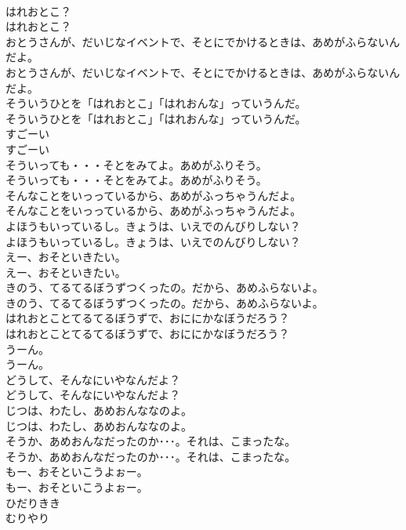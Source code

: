 \documentclass[8pt]{extreport}
\begin{document}
\begin{CJK}{UTF8}{min}
\\	はれおとこ？
\\	はれおとこ？
\\	おとうさんが、だいじなイベントで、そとにでかけるときは、あめがふらないんだよ。
\\	おとうさんが、だいじなイベントで、そとにでかけるときは、あめがふらないんだよ。
\\	そういうひとを「はれおとこ」「はれおんな」っていうんだ。
\\	そういうひとを「はれおとこ」「はれおんな」っていうんだ。
\\	すごーい
\\	すごーい
\\	そういっても・・・そとをみてよ。あめがふりそう。
\\	そういっても・・・そとをみてよ。あめがふりそう。
\\	そんなことをいっっているから、あめがふっちゃうんだよ。
\\	そんなことをいっっているから、あめがふっちゃうんだよ。
\\	よほうもいっているし。きょうは、いえでのんびりしない？
\\	よほうもいっているし。きょうは、いえでのんびりしない？
\\	えー、おそといきたい。
\\	えー、おそといきたい。
\\	きのう、てるてるぼうずつくったの。だから、あめふらないよ。
\\	きのう、てるてるぼうずつくったの。だから、あめふらないよ。
\\	はれおとことてるてるぼうずで、おににかなぼうだろう？
\\	はれおとことてるてるぼうずで、おににかなぼうだろう？
\\	うーん。
\\	うーん。
\\	どうして、そんなにいやなんだよ？
\\	どうして、そんなにいやなんだよ？
\\	じつは、わたし、あめおんななのよ。
\\	じつは、わたし、あめおんななのよ。
\\	そうか、あめおんなだったのか･･･。それは、こまったな。
\\	そうか、あめおんなだったのか･･･。それは、こまったな。
\\	もー、おそといこうよぉー。
\\	もー、おそといこうよぉー。
\\	ひだりきき
\\	むりやり

\end{CJK}
\end{document}
